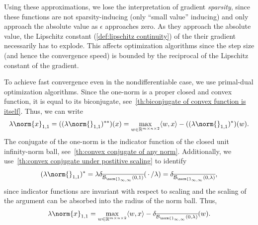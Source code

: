 Using these approximations, we lose the interpretation of gradient \emph{sparsity}, since these functions are not sparsity-inducing (only \enquote{small value} inducing) and only approach the absolute value as \( \epsilon \) approaches zero.
As they approach the absolute value, the Lipschitz constant (\cref{def:lipschitz continuity}) of the their gradient necessarily has to explode.
This affects optimization algorithms since the step size (and hence the convergence speed) is bounded by the reciprocal of the Lipschitz constant of the gradient.

To achieve fast convergence even in the nondifferentiable case, we use primal-dual optimization algorithms.
Since the one-norm is a proper closed and convex function, it is equal to its biconjugate, see~\cref{th:biconjugate of convex function is itself}.
Thus, we can write
\begin{equation}
	\lambda \norm{x}_{\num{1},\num{1}} = (\Biconjugate{(\lambda\norm{}_{\num{1},\num{1}})})(x) = \max_{w \in \R^{\Height \times \Width \times \num{2}}} \inprod{w}{x} - (\ConvexConjugate{(\lambda \norm{}_{\num{1},\num{1}})})(w).
\end{equation}
The conjugate of the one-norm is the indicator function of the closed unit infinity-norm ball, see~\cref{th:convex conjugate of any norm}.
Additionally, we use~\cref{th:convex conjugate under postitive scaling} to identify
\begin{equation}
	\ConvexConjugate{(\lambda \norm{}_{\num{1},\num{1}})} = \lambda\IndicatorFunction{\Closure{\Ball{\norm{}_{\infty,\infty}}{\num{0}}{\num{1}}}}(\argm/\lambda) = \IndicatorFunction{\Closure{\Ball{\norm{}_{\infty,\infty}}{\num{0}}{\lambda}}},
\end{equation}
since indicator functions are invariant with respect to scaling and the scaling of the argument can be absorbed into the radius of the norm ball.
Thus,
\begin{equation}
	\lambda \norm{x}_{\num{1},\num{1}} = \max_{w \in \R^{\Height \times \Width \times \num{2}}} \inprod{w}{x} - \IndicatorFunction{\Closure{\Ball{\norm{}_{\infty,\infty}}{0}{\lambda}}}(w).
\end{equation}

